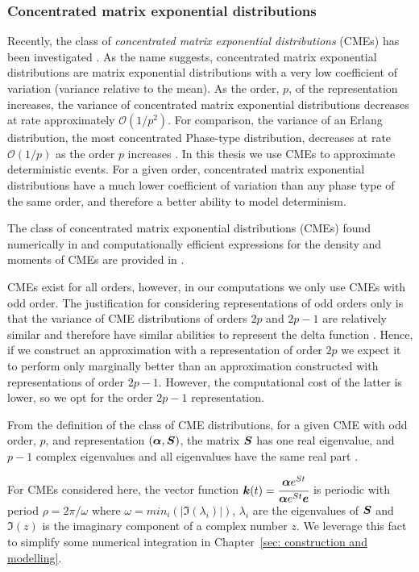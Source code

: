 \subsubsection*{Concentrated matrix exponential distributions}
Recently, the class of \emph{concentrated matrix exponential distributions} (CMEs) has been investigated \citep{ert2006,hstz2016,ert2006,hht2020,mt2021}. As the name suggests, concentrated matrix exponential distributions are matrix exponential distributions with a very low coefficient of variation (variance relative to the mean). As the order, \(p\), of the representation increases, the variance of concentrated matrix exponential distributions decreases at rate approximately \(\mathcal O(1/p^2)\). For comparison, the variance of an Erlang distribution, the most concentrated Phase-type distribution, decreases at rate \(\mathcal O(1/p)\) as the order \(p\) increases \citep{as1987}. In this thesis we use CMEs to approximate deterministic events. For a given order, concentrated matrix exponential distributions have a much lower coefficient of variation than any phase type of the same order, and therefore a better ability to model determinism. 

The class of concentrated matrix exponential distributions (CMEs) found numerically in \citep{hht2020} and computationally efficient expressions for the density and moments of CMEs are provided in \citep{hht2020}. 

CMEs exist for all orders, however, in our computations we only use CMEs with odd order. The justification for considering representations of odd orders only is that the variance of CME distributions of orders \(2p\) and \(2p-1\) are relatively similar and therefore have similar abilities to represent the delta function \citep{hht2020}. Hence, if we construct an approximation with a representation of order \(2p\) we expect it to perform only marginally better than an approximation constructed with representations of order \(2p-1\). However, the computational cost of the latter is lower, so we opt for the order \(2p-1\) representation. 

From the definition of the class of CME distributions, for a given CME with odd order, \(p\), and representation \((\boldsymbol\alpha,\boldsymbol S)\), the matrix \(\boldsymbol S\) has one real eigenvalue, and \(p-1\) complex eigenvalues and all eigenvalues have the same real part \cite{hht2020}. 

For CMEs considered here, the vector function \(\boldsymbol k(t)=\cfrac{\boldsymbol \alpha e^{St}}{\boldsymbol \alpha e^{St}\boldsymbol e}\) is periodic with period \(\rho = 2\pi/\omega\) where \(\omega=min_i(|\Im(\lambda_i)|)\), \(\lambda_i\) are the eigenvalues of \(\boldsymbol{S}\) and \(\Im(z)\) is the imaginary component of a complex number \(z\). We leverage this fact to simplify some numerical integration in Chapter~\ref{sec: construction and modelling}. 



